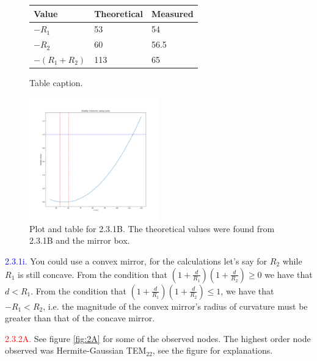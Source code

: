 \documentclass[letterpaper, reqno,11pt]{article}
\begin{document}
\begin{figure}[htpb]
    \centering
    \begin{minipage}[b]{0.45\textwidth}
    \begin{tabular}{|l|l|l|}
    \hline
    Value & Theoretical & Measured \\
    \hline
    $-R_1$ & 53 & 54 \\
    $-R_2$ & 60 & 56.5 \\
    $-(R_1+R_2)$ & 113 & 65 \\
    \hline
    \end{tabular}
    \caption{Table caption.}
    \label{fig:table1}
    \end{minipage}
    \hfill
    \includegraphics[width=0.5\textwidth]{1B}
    \caption{Plot and table for 2.3.1B. The theoretical values were found from 2.3.1B and the mirror box.}
    \label{fig:1A}
\end{figure}

\noindent \textcolor{blue}{2.3.1i.} You could use a convex mirror, for the calculations let's say for $R_2$ while $R_1$ is still concave. From the condition that $\left(1+ \frac{d}{R_1}\right) \left( 1+ \frac{d}{R_2} \right)\geq 0$ we have that $d<R_1$. From the condition that $\left(1+ \frac{d}{R_1}\right) \left( 1+ \frac{d}{R_2} \right)\leq 1$, we have that $-R_1<R_2$, i.e. the magnitude of the convex mirror's radius of curvature must be greater than that of the concave mirror.

\noindent \textcolor{red}{2.3.2A.} See figure \ref{fig:2A} for some of the observed nodes. The highest order node observed was Hermite-Gaussian TEM$_{22}$, see the figure for explanations.
\end{document}
